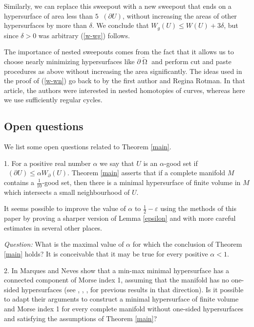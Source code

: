 \documentclass[12pt]{amsart}
\DeclareMathOperator{\Hn}{\mathcal{H}^n}
\DeclareMathOperator{\Om}{\Omega}
\newcommand{\Cgs}{5 \Hn(\partial U)}
\theoremstyle{definition}
\begin{document}
Similarly, we can replace this sweepout with a new sweepout
that ends on a hypersurface of area less than $\Cgs$,
without increasing the areas of other hypersurfaces by more
than $\delta$. We conclude that $W_g(U) \leq W(U) + 3 \delta$,
but since $\delta>0$ was arbitrary (\ref*{w-wg}) follows.

The importance of nested sweepouts comes from the fact that it allows us to choose
nearly minimizing hypersurfaces like $\partial \tilde{\Om}$ and perform cut and paste procedures
as above without increasing the area significantly.
The ideas used in the proof of (\ref*{w-wn}) 
go back to \cite{CR} 
by the first author and Regina Rotman.  In that article, the authors were interested in
nested homotopies of curves, whereas here we use sufficiently regular cycles.  

\subsection{Open questions} \label{questions}
We list some open questions related to Theorem \ref*{main}.

1. For a positive real number  $\alpha$ 
we say that $U$ is an $\alpha$-good set if
$\Hn(\partial U) \leq \alpha W_{\partial}(U)$.
Theorem \ref*{main} asserts that if a complete
manifold $M$ contains a $\frac{1}{10}$-good set,
then there is a minimal hypersurface of finite
volume in $M$ which intersects a small neighbourhood of $U$.

It seems possible to improve the value of $\alpha$ to 
$\frac{1}{2}-\varepsilon$ using the methods of this paper by proving a sharper version
of Lemma \ref*{epsilon} and with more careful estimates in several other places.

\textit{Question:} What is the maximal value of $\alpha$
for which the conclusion of Theorem \ref*{main} holds?
It is conceivable that it may be true
for every positive $\alpha<1$.

2. In \cite{MN2} Marques and Neves show that a min-max
minimal hypersurface has a connected component of 
Morse index 1,
assuming that the manifold has no one-sided
hypersurfaces
(see \cite{MR}, \cite{So1}, \cite{Zh1}, \cite{Zh2} for previous results in that direction).
Is it possible to adapt their arguments
to construct a minimal hypersurface of finite volume and Morse
index 1 for every complete manifold without one-sided hypersurfaces and
satisfying the assumptions
of Theorem \ref*{main}?
\end{document}
